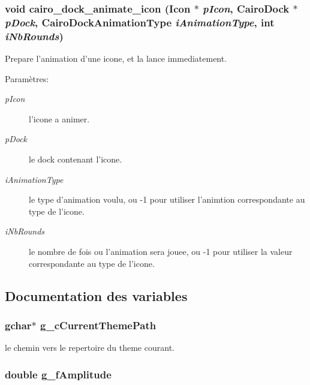 \subsubsection{\setlength{\rightskip}{0pt plus 5cm}void cairo\_\-dock\_\-animate\_\-icon ({\bf Icon} $\ast$ {\em p\-Icon}, {\bf Cairo\-Dock} $\ast$ {\em p\-Dock}, {\bf Cairo\-Dock\-Animation\-Type} {\em i\-Animation\-Type}, int {\em i\-Nb\-Rounds})}\label{cairo-dock-applet-factory_8c_bdb9b030d1be18daf86caa31464fb955}


Prepare l'animation d'une icone, et la lance immediatement. \begin{Desc}
\item[Param\`{e}tres:]
\begin{description}
\item[{\em p\-Icon}]l'icone a animer. \item[{\em p\-Dock}]le dock contenant l'icone. \item[{\em i\-Animation\-Type}]le type d'animation voulu, ou -1 pour utiliser l'animtion correspondante au type de l'icone. \item[{\em i\-Nb\-Rounds}]le nombre de fois ou l'animation sera jouee, ou -1 pour utiliser la valeur correspondante au type de l'icone. \end{description}
\end{Desc}


\subsection{Documentation des variables}
\subsubsection{\setlength{\rightskip}{0pt plus 5cm}gchar$\ast$ {\bf g\_\-c\-Current\-Theme\-Path}}\label{cairo-dock-applet-factory_8c_c9102142a8dd6330299f9340c9d2b704}


le chemin vers le repertoire du theme courant. 

\subsubsection{\setlength{\rightskip}{0pt plus 5cm}double {\bf g\_\-f\-Amplitude}}\label{cairo-dock-applet-factory_8c_71125a40fdc7b421002f176b9b82ac79}


